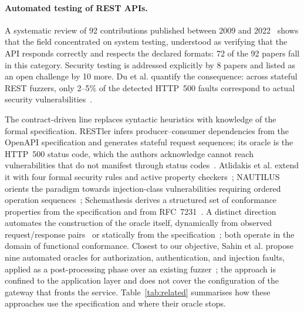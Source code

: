 \documentclass[
]{ceurart}
\begin{document}
\paragraph{Automated testing of REST APIs.}
A systematic review of 92 contributions published between 2009 and 2022~\cite{golmohammadiTestingRESTfulAPIs2023} shows that the field concentrated on system testing, understood as verifying that the API responds correctly and respects the declared formats: 72 of the 92 papers fall in this category.
Security testing is addressed explicitly by 8 papers and listed as an open challenge by 10 more.
Du et al. quantify the consequence: across stateful REST fuzzers, only 2--5\% of the detected HTTP~500 faults correspond to actual security vulnerabilities~\cite{duVulnerabilityorientedTestingRESTful2024}.

The contract-driven line replaces syntactic heuristics with knowledge of the formal specification.
RESTler infers producer--consumer dependencies from the OpenAPI specification and generates stateful request sequences; its oracle is the HTTP~500 status code, which the authors acknowledge cannot reach vulnerabilities that do not manifest through status codes~\cite{atlidakisRESTlerStatefulREST2019a}.
Atlidakis et al. extend it with four formal security rules and active property checkers~\cite{atlidakisCheckingSecurityProperties2020}; NAUTILUS orients the paradigm towards injection-class vulnerabilities requiring ordered operation sequences~\cite{dengNAUTILUSAutomatedRESTful2023}; Schemathesis derives a structured set of conformance properties from the specification and from RFC~7231~\cite{schemathesisDerivingSemanticsawareFuzzers2022}.
A distinct direction automates the construction of the oracle itself, dynamically from observed request/response pairs~\cite{alonsoAGORAAutomatedGeneration2023, alonsoAgora+TestOracleGeneration2025} or statically from the specification~\cite{alonsoSATORIStaticTest2025}; both operate in the domain of functional conformance.
Closest to our objective, Sahin et al. propose nine automated oracles for authorization, authentication, and injection faults, applied as a post-processing phase over an existing fuzzer~\cite{sahinEnhancingRESTAPI2026}; the approach is confined to the application layer and does not cover the configuration of the gateway that fronts the service.
Table~\ref{tab:related} summarises how these approaches use the specification and where their oracle stops.
\end{document}
